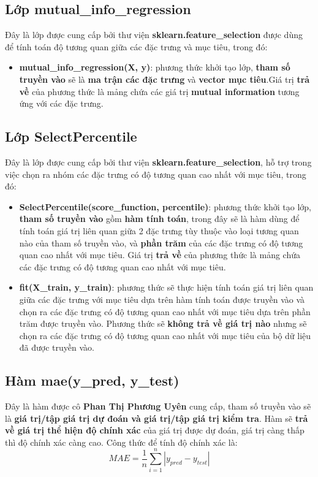 \documentclass{report}
\begin{document}
\subsection{Lớp mutual\_info\_regression}
    Đây là lớp được cung cấp bởi thư viện \textbf{sklearn.feature\_selection} được dùng để tính toán độ tương quan giữa các đặc trưng và mục tiêu, trong đó:
    \begin{itemize}
        \item \textbf{mutual\_info\_regression(X, y)}: phương thức khởi tạo lớp, \textbf{tham số truyền vào} sẽ là \textbf{ma trận các đặc trưng} và \textbf{vector mục tiêu}.Giá trị \textbf{trả về} của phương thức là mảng chứa các giá trị \textbf{mutual information} tương ứng với các đặc trưng.
    \end{itemize}

\subsection{Lớp SelectPercentile}
    Đây là lớp được cung cấp bởi thư viện \textbf{sklearn.feature\_selection}, hỗ trợ trong việc chọn ra nhóm các đặc trưng có độ tương quan cao nhất với mục tiêu, trong đó:
    \begin{itemize}
        \item \textbf{SelectPercentile(score\_function, percentile)}: phương thức khởi tạo lớp, \textbf{tham số truyền vào} gồm \textbf{hàm tính toán}, trong đây sẽ là hàm dùng để tính toán giá trị liên quan giữa 2 đặc trưng tùy thuộc vào loại tương quan nào của tham số truyền vào, và \textbf{phần trăm} của các đặc trưng có độ tương quan cao nhất với mục tiêu. Giá trị \textbf{trả về} của phương thức là mảng chứa các đặc trưng có độ tương quan cao nhất với mục tiêu.
        \item \textbf{fit(X\_train, y\_train)}: phương thức sẽ thực hiện tính toán giá trị liên quan giữa các đặc trưng với mục tiêu dựa trên hàm tính toán được truyền vào và chọn ra các đặc trưng có độ tương quan cao nhất với mục tiêu dựa trên phần trăm được truyền vào. Phương thức sẽ \textbf{không trả về giá trị nào} nhưng sẽ chọn ra các đặc trưng có độ tương quan cao nhất với mục tiêu của bộ dữ liệu đã được truyền vào.
    \end{itemize}
\subsection{Hàm mae(y\_pred, y\_test)}\label{sec:mae}
    Đây là hàm được cô \textbf{Phan Thị Phương Uyên} cung cấp, tham số truyền vào sẽ là \textbf{giá trị/tập giá trị dự đoán và giá trị/tập giá trị kiểm tra}. Hàm sẽ \textbf{trả về giá trị thể hiện độ chính xác} của giá trị được dự đoán, giá trị càng thấp thì độ chính xác càng cao. Công thức để tính độ chính xác là:
    \begin{equation}
        MAE = \frac{1}{n}\sum_{i=1}^{n}|y_{pred} - y_{test}|
    \end{equation}
\end{document}

